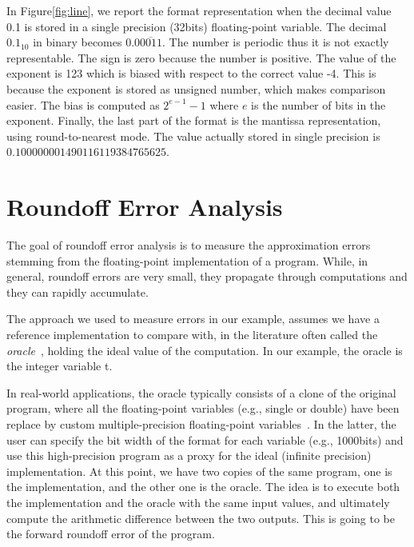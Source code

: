 In Figure\ref{fig:line}, we report the format representation when the decimal value 0.1 is stored in a single precision (32bits) floating-point variable.
%
The decimal $0.1_{10}$ in binary becomes $0.0\overline{0011}$.
%
The number is periodic thus it is not exactly representable.
%
The sign is zero because the number is positive.
%
The value of the exponent is 123 which is biased with respect to the correct value -4.
%
This is because the exponent is stored as unsigned number, which makes comparison easier.
%
The bias is computed as $2^{e-1}-1$ where $e$ is the number of bits in the exponent.
%
Finally, the last part of the format is the mantissa representation, using round-to-nearest mode.
%
The value actually stored in single precision is $0.100000001490116119384765625$.
\section{Roundoff Error Analysis}
%
The goal of roundoff error analysis is to measure the approximation errors stemming from the floating-point implementation of a program.
%
While, in general, roundoff errors are very small, they propagate through computations and they can rapidly accumulate.
%
%
%

The approach we used to measure errors in our example, assumes we have a reference implementation to compare with, in the literature often called the \emph{oracle}~\cite{blame}, holding the ideal value of the computation.
%
In our example, the oracle is the integer variable t.
% 

In real-world applications, the oracle typically consists of a clone of the original program, where all the floating-point variables (e.g., single or double) have been replace by custom multiple-precision floating-point variables~\cite{mpfr}.
%
In the latter, the user can specify the bit width of the format for each variable (e.g., 1000bits) and use this high-precision program as a proxy for the ideal (infinite precision) implementation.
%
At this point, we have two copies of the same program, one is the implementation, and the other one is the oracle. 
%
The idea is to execute both the implementation and the oracle with the same input values, and ultimately compute the arithmetic difference between the two outputs. 
%
This is going to be the forward roundoff error of the program. 
%

